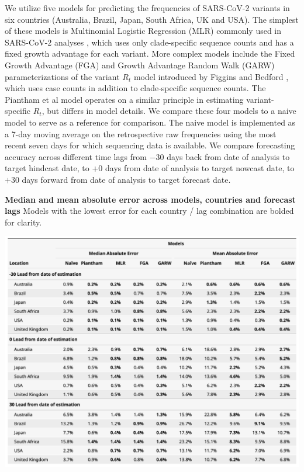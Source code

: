 \documentclass[11pt,oneside,letterpaper]{article}
\begin{document}
We utilize five models for predicting the frequencies of SARS-CoV-2 variants in six countries (Australia, Brazil, Japan, South Africa, UK and USA).
The simplest of these models is Multinomial Logistic Regression (MLR) commonly used in SARS-CoV-2 analyses \cite{annavajhala2021emergence, faria2021genomics, obermeyer2022analysis, susswein2023early}, which uses only clade-specific sequence counts and has a fixed growth advantage for each variant.
More complex models include the Fixed Growth Advantage (FGA) and Growth Advantage Random Walk (GARW) parameterizations of the variant $R_t$ model introduced by Figgins and Bedford \cite{figgins2022sars}, which uses case counts in addition to clade-specific sequence counts.
The Piantham et al model \cite{piantham2021estimating} operates on a similar principle in estimating variant-specific $R_t$, but differs in model details.
We compare these four models to a naive model to serve as a reference for comparison.
The naive model is implemented as a 7-day moving average on the retrospective raw frequencies using the most recent seven days for which sequencing data is available.
We compare forecasting accuracy across different time lags from $-30$ days back from date of analysis to target hindcast date, to +0 days from date of analysis to target nowcast date, to $+30$ days forward from date of analysis to target forecast date.

\begin{table}[tb!]
	\centering
	\caption{
		\textbf{Median and mean absolute error across models, countries and forecast lags}
		Models with the lowest error for each country / lag combination are bolded for clarity.
	}
	\includegraphics[width=1\textwidth]{figures/model_comp_table.png}
	\label{table:model_comp_table}
\end{table}
\end{document}
